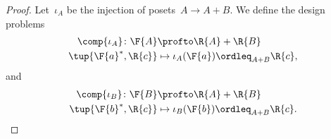 \begin{proof}
  Let~$\iota_A$ be the injection of posets~$A \to A+B$. We define the design problems
  \begin{equation}
    \begin{aligned}
      \comp{\iota_A} \colon \F{A} &\profto \R{A} + \R{B}\\
      \tup{\F{a}^*,\R{c}} &\mapsto \iota_A(\F{a})\ordleq_{A+B}\R{c},
    \end{aligned}
  \end{equation}
  and
  \begin{equation}
    \begin{aligned}
      \comp{\iota_B} \colon \F{B} &\profto \R{A} + \R{B}\\
      \tup{\F{b}^*,\R{c}} &\mapsto \iota_B(\F{b})\ordleq_{A+B}\R{c}.
    \end{aligned}
  \end{equation}


\end{proof}
